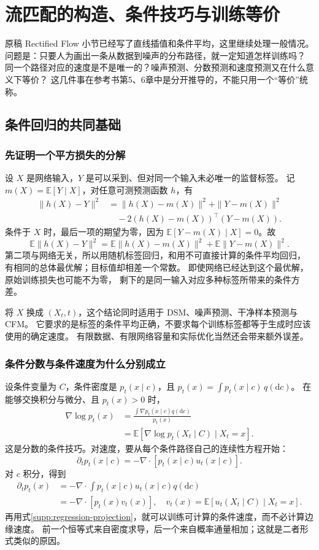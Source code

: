 \chapter{流匹配的构造、条件技巧与训练等价}
\label{supp:flow}

原稿 Rectified Flow 小节已经写了直线插值和条件平均，这里继续处理一般情况。
问题是：只要人为画出一条从数据到噪声的分布路径，就一定知道怎样训练吗？
同一个路径对应的速度是不是唯一的？噪声预测、分数预测和速度预测又在什么意义下等价？
这几件事在参考书第5、6章中是分开推导的，不能只用一个“等价”统称。\cite{theorybook,fm,flow-guide}

\section{条件回归的共同基础}
\subsection{先证明一个平方损失的分解}
设 $X$ 是网络输入，$Y$ 是可以采到、但对同一个输入未必唯一的监督标签。
记 $m(X)=\mathbb E[Y\mid X]$，对任意可测预测函数 $h$，有
\begin{align}
\|h(X)-Y\|^2
 &=\|h(X)-m(X)\|^2+\|Y-m(X)\|^2\\
 &\quad-2(h(X)-m(X))^\top(Y-m(X)).
\end{align}
条件于 $X$ 时，最后一项的期望为零，因为
$\mathbb E[Y-m(X)\mid X]=0$。故
\[
\mathbb E\|h(X)-Y\|^2
=\mathbb E\|h(X)-m(X)\|^2
 +\mathbb E\|Y-m(X)\|^2.
\label{supp:regression-projection}
\]
第二项与网络无关，所以用随机标签回归，和用不可直接计算的条件平均回归，
有相同的总体最优解；目标值却相差一个常数。
即使网络已经达到这个最优解，原始训练损失也可能不为零，
剩下的是同一输入对应多种标签所带来的条件方差。

将 $X$ 换成 $(X_t,t)$，这个结论同时适用于 DSM、噪声预测、干净样本预测与 CFM。
它要求的是标签的条件平均正确，不要求每个训练标签都等于生成时应该使用的确定速度。
有限数据、有限网络容量和实际优化当然还会带来额外误差。

\subsection{条件分数与条件速度为什么分别成立}
设条件变量为 $C$，条件密度是 $p_t(x\mid c)$，且
$p_t(x)=\int p_t(x\mid c)\,q(\mathrm dc)$。
在能够交换积分与微分、且 $p_t(x)>0$ 时，
\begin{align}
\nabla\log p_t(x)
 &=\frac{\int\nabla p_t(x\mid c)q(\mathrm dc)}{p_t(x)}\\
 &=\mathbb E[\nabla\log p_t(X_t\mid C)\mid X_t=x].
\end{align}
这是分数的条件技巧。对速度，要从每个条件路径自己的连续性方程开始：
\[
\partial_tp_t(x\mid c)=-\nabla\cdot[p_t(x\mid c)u_t(x\mid c)].
\]
对 $c$ 积分，得到
\begin{align}
\partial_tp_t(x)
 &=-\nabla\cdot\int p_t(x\mid c)u_t(x\mid c)q(\mathrm dc)\\
 &=-\nabla\cdot[p_t(x)v_t(x)],\quad
v_t(x)=\mathbb E[u_t(X_t\mid C)\mid X_t=x].
\label{supp:conditional-velocity}
\end{align}
再用式\eqref{supp:regression-projection}，就可以训练可计算的条件速度，而不必计算边缘速度。
前一个恒等式来自密度求导，后一个来自概率通量相加；这就是二者形式类似的原因。

